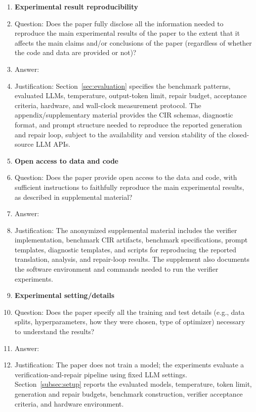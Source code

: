 \begin{enumerate}
\item {\bf Experimental result reproducibility}
    \item[] Question: Does the paper fully disclose all the information needed to reproduce the main experimental results of the paper to the extent that it affects the main claims and/or conclusions of the paper (regardless of whether the code and data are provided or not)?
    \item[] Answer: \answerYes{}
    \item[] Justification: Section~\ref{sec:evaluation} specifies the benchmark patterns, evaluated LLMs, temperature, output-token limit, repair budget, acceptance criteria, hardware, and wall-clock measurement protocol. The appendix/supplementary material provides the CIR schemas, diagnostic format, and prompt structure needed to reproduce the reported generation and repair loop, subject to the availability and version stability of the closed-source LLM APIs.

\item {\bf Open access to data and code}
    \item[] Question: Does the paper provide open access to the data and code, with sufficient instructions to faithfully reproduce the main experimental results, as described in supplemental material?
    \item[] Answer: \answerYes{}
    \item[] Justification: The anonymized supplemental material includes the verifier implementation, benchmark CIR artifacts, benchmark specifications, prompt templates, diagnostic templates, and scripts for reproducing the reported translation, analysis, and repair-loop results. The supplement also documents the software environment and commands needed to run the verifier experiments.

\item {\bf Experimental setting/details}
    \item[] Question: Does the paper specify all the training and test details (e.g., data splits, hyperparameters, how they were chosen, type of optimizer) necessary to understand the results?
    \item[] Answer: \answerYes{}
    \item[] Justification: The paper does not train a model; the experiments evaluate a verification-and-repair pipeline using fixed LLM settings. Section~\ref{subsec:setup} reports the evaluated models, temperature, token limit, generation and repair budgets, benchmark construction, verifier acceptance criteria, and hardware environment.


\end{enumerate}
